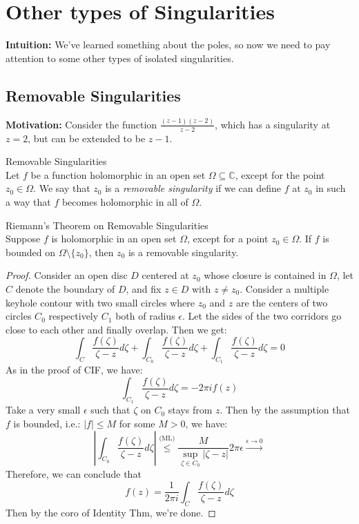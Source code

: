 \section{Other types of Singularities}

\noindent\textbf{Intuition:} We've learned something  about the poles, so now we need to pay attention to some other types of isolated singularities.

\subsection{Removable Singularities}

\noindent\textbf{Motivation:} Consider the function $\frac{(z-1)(z-2)}{z-2}$, which has a singularity at $z=2$, but can be extended to be $z-1$.

\begin{definition}{Removable Singularities}\\
Let $f$ be a function holomorphic in an open set $\Omega \subseteq \mathbb{C}$, except for the point $z_0 \in \Omega$. We say that $z_0$ is a \textit{removable singularity} if we can define $f$ at $z_0$ in such a way that $f$ becomes holomorphic in all of $\Omega$.
\end{definition}

\begin{theorem}{Riemann's Theorem on Removable Singularities}\\
Suppose $f$ is holomorphic in an open set $\Omega$, except for a point $z_0 \in \Omega$. If $f$ is bounded on $\Omega \setminus \{z_0\}$, then $z_0$ is a removable singularity.
\end{theorem}

\begin{proof}
    Consider an open disc $D$ centered at $z_0$ whose closure is contained in $\Omega$, let $C$ denote the boundary of $D$, and fix $z\in D$ with $z\neq z_0$. Consider a multiple keyhole contour with two small circles where $z_0$ and $z$ are the centers of two circles $C_0$ respectively $C_1$ both of radius $\epsilon$. Let the sides of the two corridors go close to each other and finally overlap. Then we get:
    \[
    \int_C \frac{f(\zeta)}{\zeta -z}d\zeta +\int_{C_0} \frac{f(\zeta)}{\zeta -z}d\zeta + \int_{C_1} \frac{f(\zeta)}{\zeta -z}d\zeta=0
    \]
    As in the proof of CIF, we have:
    \[
    \int_{C_1} \frac{f(\zeta)}{\zeta -z}d\zeta=-2\pi if(z)
    \]
    Take a very small $\epsilon$ such that $\zeta$ on $C_0$ stays from $z$. Then by the assumption that $f$ is bounded, i.e.: $|f|\leq M$ for some $M>0$, we have:
    \[
    |\int_{C_0} \frac{f(\zeta)}{\zeta -z}d\zeta| \overset{(\text{ML)}}{\leq} \frac{M}{\sup_{\zeta \in C_0} |\zeta -z|} 2\pi \epsilon \xrightarrow{\epsilon\to0}
    \]
    Therefore, we can conclude that
    \[
    f(z)= \frac{1}{2\pi i} \int_{C} \frac{f(\zeta)}{\zeta -z}d\zeta
    \]
    Then by the coro of Identity Thm, we're done.
\end{proof}

